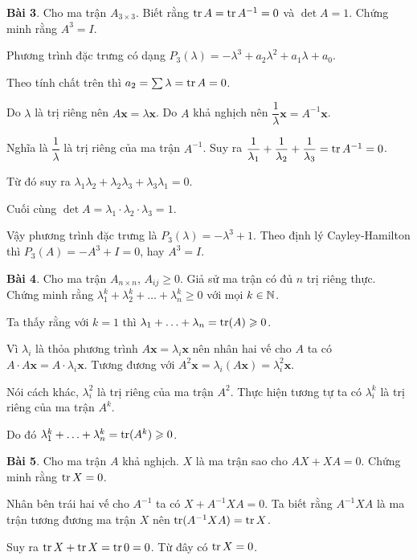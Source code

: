 \hfill

\textbf{Bài 3}. Cho ma trận $A_{3 \times 3}$. Biết rằng $\operatorname{tr} A = \operatorname{tr} A^{-1} = 0$ và $\det A = 1$. Chứng minh rằng $A^3 = I$.

Phương trình đặc trưng có dạng $P_3(\lambda) = -\lambda^3 + a_2 \lambda^2 + a_1 \lambda + a_0$.

Theo tính chất trên thì $a_2 = \sum \lambda = \operatorname{tr} A = 0$.

Do $\lambda$ là trị riêng nên $A \bm{x} = \lambda \bm{x}$. Do $A$ khả nghịch nên $\dfrac{1}{\lambda} \bm{x} = A^{-1} \bm{x}$.

Nghĩa là $\dfrac{1}{\lambda}$ là trị riêng của ma trận $A^{-1}$. Suy ra $\dfrac{1}{\lambda_1} + \dfrac{1}{\lambda_2} + \dfrac{1}{\lambda_3} = \operatorname{tr} A^{-1} = 0$.

Từ đó suy ra $\lambda_1 \lambda_2 + \lambda_2 \lambda_3 + \lambda_3 \lambda_1 = 0$.

Cuối cùng $\det A = \lambda_1 \cdot \lambda_2 \cdot \lambda_3 = 1$.

Vậy phương trình đặc trưng là $P_3(\lambda) = -\lambda^3 + 1$. Theo định lý Cayley-Hamilton thì $P_3(A) = -A^3 + I = 0$, hay $A^3 = I$.

\hfill

\textbf{Bài 4}. Cho ma trận $A_{n \times n}$, $A_{ij} \geqslant 0$. Giả sử ma trận có đủ $n$ trị riêng thực. Chứng minh rằng $\lambda_1^k + \lambda_2^k + \ldots + \lambda_n^k \geqslant 0$ với mọi $k \in \mathbb{N}$.

Ta thấy rằng với $k=1$ thì $\lambda_1 + \ldots + \lambda_n = \operatorname{tr}(A) \geqslant 0$.

Vì $\lambda_i$ là thỏa phương trình $A \bm{x} = \lambda_i \bm{x}$ nên nhân hai vế cho $A$ ta có $A \cdot A \bm{x} = A \cdot \lambda_i \bm{x}$. Tương đương với $A^2 \bm{x} = \lambda_i (A \bm{x}) = \lambda_i^2 \bm{x}$.

Nói cách khác, $\lambda_i^2$ là trị riêng của ma trận $A^2$. Thực hiện tương tự ta có $\lambda_i^k$ là trị riêng của ma trận $A^k$.

Do đó $\lambda_1^k + \ldots + \lambda_n^k = \operatorname{tr}(A^k) \geqslant 0$.

\hfill

\textbf{Bài 5}. Cho ma trận $A$ khả nghịch. $X$ là ma trận sao cho $AX + XA = 0$. Chứng minh rằng $\operatorname{tr} X = 0$.

Nhân bên trái hai vế cho $A^{-1}$ ta có $X + A^{-1} X A = 0$. Ta biết rằng $A^{-1} X A$ là ma trận tương đương ma trận $X$ nên $\operatorname{tr} (A^{-1} X A) = \operatorname{tr} X$.

Suy ra $\operatorname{tr} X + \operatorname{tr} X = \operatorname{tr} 0 = 0$. Từ đây có $\operatorname{tr} X = 0$.